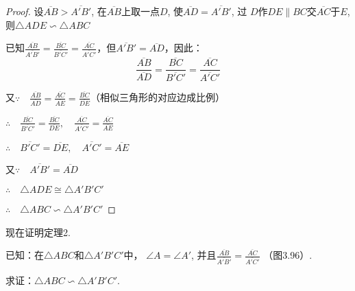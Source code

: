 \begin{proof}
    设$\overline{AB}>\overline{A'B'}$, 在$\overline{AB}$上取一点$D$, 使$\overline{AD}=\overline{A'B'}$, 过
$D$作$DE\parallel BC$交$\overline{AC}$于$E$, 则$\triangle ADE\backsim \triangle ABC$

已知$\frac{\overline{AB}}{\overline{A'B'}}=\frac{\overline{BC}}{\overline{B'C'}}=\frac{\overline{AC}}{\overline{A'C'}}$，但$\overline{A'B'}=\overline{AD}$，因此：
\[\frac{\overline{AB}}{\overline{AD}}=\frac{\overline{BC}}{\overline{B'C'}}=\frac{\overline{AC}}{\overline{A'C'}}\]

又$\because\quad \frac{\overline{AB}}{\overline{AD}}=\frac{\overline{AC}}{\overline{AE}}=\frac{\overline{BC}}{\overline{DE}}$（相似三角形的对应边成比例）

$\therefore\quad  \frac{\overline{BC}}{\overline{B'C'}}=\frac{\overline{BC}}{\overline{DE}},\quad \frac{\overline{AC}}{\overline{A'C'}}=\frac{\overline{AC}}{\overline{AE}}$

$\therefore\quad \overline{B'C'}=\overline{DE},\quad \overline{A'C'}=\overline{AE}$

又$\because\quad \overline{A'B'}=\overline{AD}$

$\therefore\quad \triangle ADE\cong \triangle A'B'C'$

$\therefore\quad \triangle ABC\backsim \triangle A'B'C'$
\end{proof}

现在证明定理2.

已知：在$\triangle ABC$和$\triangle A'B'C'$中，
$\angle A=\angle A'$, 并且$\frac{\overline{AB}}{\overline{A'B'}}=\frac{\overline{AC}}{\overline{A'C'}}$
（图3.96）.

求证：$\triangle ABC\backsim \triangle A'B'C'$.

\begin{figure}[htp]
    \centering
{}
    \caption{}
\end{figure}

